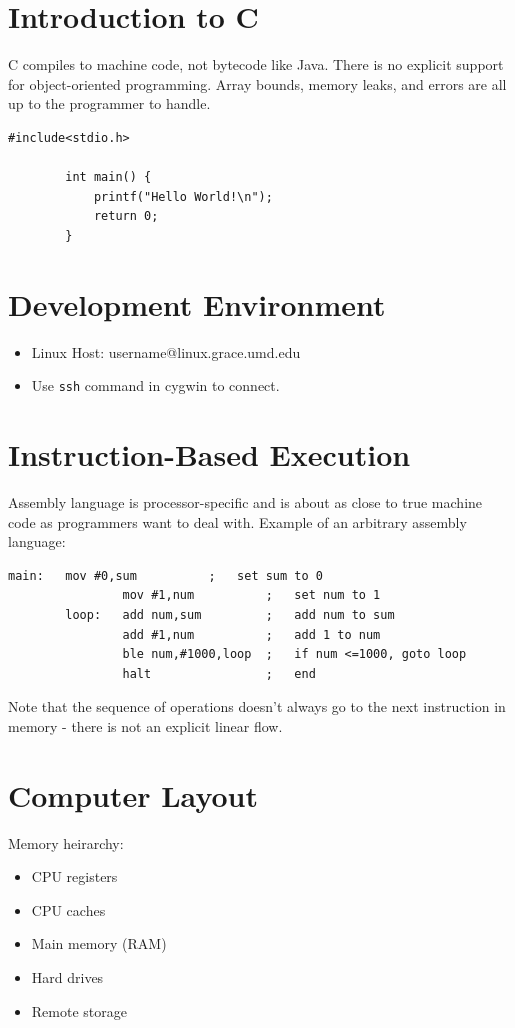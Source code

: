 \documentclass[11pt]{article}
\begin{document}
\section{Introduction to C}
	C compiles to machine code, not bytecode like Java. There is no explicit support for object-oriented programming. Array bounds, memory leaks, and errors are all up to the programmer to handle.

	\begin{lstlisting}[autogobble=true]
		#include<stdio.h>
		
		int main() {
			printf("Hello World!\n");
			return 0;
		}
	\end{lstlisting}
	
\section{Development Environment}
	\begin{itemize}
		\item Linux Host: username@linux.grace.umd.edu
		\item Use \verb|ssh| command in cygwin to connect.
	\end{itemize}
	
\section{Instruction-Based Execution}
	Assembly language is processor-specific and is about as close to true machine code as programmers want to deal with. Example of an arbitrary assembly language:

	\begin{lstlisting}[autogobble=true]
		main:	mov	#0,sum			;	set sum to 0
				mov	#1,num			;	set num to 1
		loop:	add	num,sum			;	add num to sum
				add	#1,num			;	add 1 to num
				ble	num,#1000,loop	;	if num <=1000, goto loop
				halt				;	end	
	\end{lstlisting}
	
	Note that the sequence of operations doesn't always go to the next instruction in memory - there is not an explicit linear flow.
	
\section{Computer Layout}
	Memory heirarchy:
	\begin{itemize}
		\item CPU registers
		\item CPU caches
		\item Main memory (RAM)
		\item Hard drives
		\item Remote storage
	\end{itemize}
	
\end{document}
